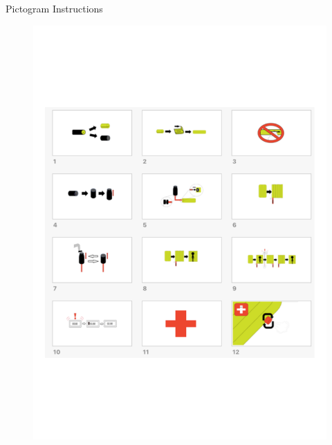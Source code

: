 \documentclass[final]{beamer}
\newlength{\onecolwid}
\begin{document}
\begin{frame}
\begin{columns}[t]
\begin{column}{\onecolwid}
\begin{block}{Pictogram Instructions}
\begin{figure}
\includegraphics[width=1\linewidth]{img/Instructions.pdf}
\end{figure}

\end{block}


\end{column}
\end{columns}
\end{frame}
\end{document}
